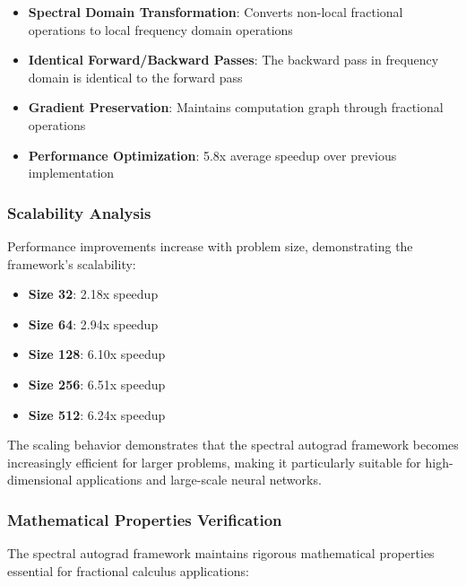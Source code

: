 \begin{itemize}
    \item \textbf{Spectral Domain Transformation}: Converts non-local fractional operations to local frequency domain operations
    \item \textbf{Identical Forward/Backward Passes}: The backward pass in frequency domain is identical to the forward pass
    \item \textbf{Gradient Preservation}: Maintains computation graph through fractional operations
    \item \textbf{Performance Optimization}: 5.8x average speedup over previous implementation
\end{itemize}

\subsubsection{Scalability Analysis}

Performance improvements increase with problem size, demonstrating the framework's scalability:

\begin{itemize}
    \item \textbf{Size 32}: 2.18x speedup
    \item \textbf{Size 64}: 2.94x speedup
    \item \textbf{Size 128}: 6.10x speedup
    \item \textbf{Size 256}: 6.51x speedup
    \item \textbf{Size 512}: 6.24x speedup
\end{itemize}

The scaling behavior demonstrates that the spectral autograd framework becomes increasingly efficient for larger problems, making it particularly suitable for high-dimensional applications and large-scale neural networks.

\subsubsection{Mathematical Properties Verification}

The spectral autograd framework maintains rigorous mathematical properties essential for fractional calculus applications:

